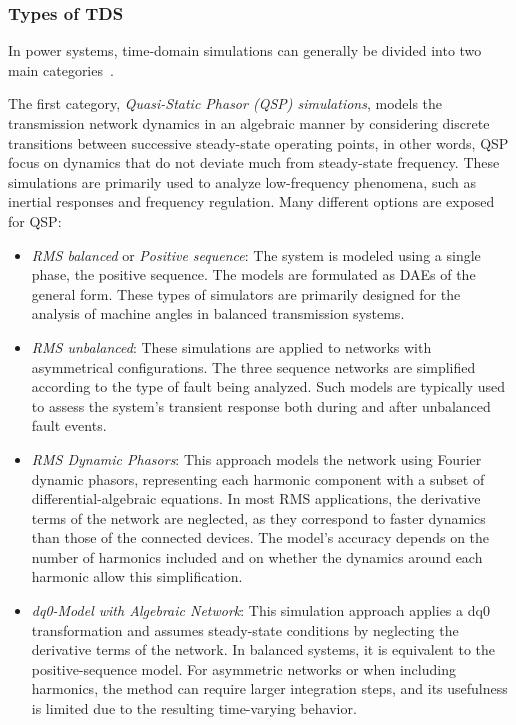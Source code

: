 \subsubsection{Types of TDS}

In power systems, time-domain simulations can generally be divided into two main categories~\cite{LaraTDS}. 

The first category, \textit{Quasi-Static Phasor (QSP) simulations}, models the transmission network dynamics in an algebraic manner by considering discrete transitions
between successive steady-state operating points, in other words, QSP focus on dynamics that do not deviate much from steady-state frequency.
These simulations are primarily used to analyze low-frequency phenomena, such as inertial responses and frequency regulation. 
Many different options are exposed for QSP:

\begin{itemize}
    \item \textit{RMS balanced} or \textit{Positive sequence}: The system is modeled using a single phase, the positive sequence. The models are formulated as DAEs of the general form.
     These types of simulators are primarily designed for the analysis of machine angles in balanced transmission systems. 
    \item \textit{RMS unbalanced}: These simulations are applied to networks with asymmetrical configurations. The three sequence networks are simplified according to the type 
    of fault being analyzed. Such models are typically used to assess the system's transient response both during and after unbalanced fault events.
    \item \textit{RMS Dynamic Phasors}: This approach models the network using Fourier dynamic phasors, representing each harmonic component with a subset of differential-algebraic equations. 
    In most RMS applications, the derivative terms of the network are neglected, as they correspond to faster dynamics than those of the connected devices. 
    The model's accuracy depends on the number of harmonics included and on whether the dynamics around each harmonic allow this simplification.
    \item \textit{dq0-Model with Algebraic Network}: This simulation approach applies a dq0 transformation and assumes steady-state conditions by neglecting the derivative terms
     of the network. In balanced systems, it is equivalent to the positive-sequence model. For asymmetric networks or when including harmonics, the method can require larger
     integration steps, and its usefulness is limited due to the resulting time-varying behavior.
\end{itemize}


